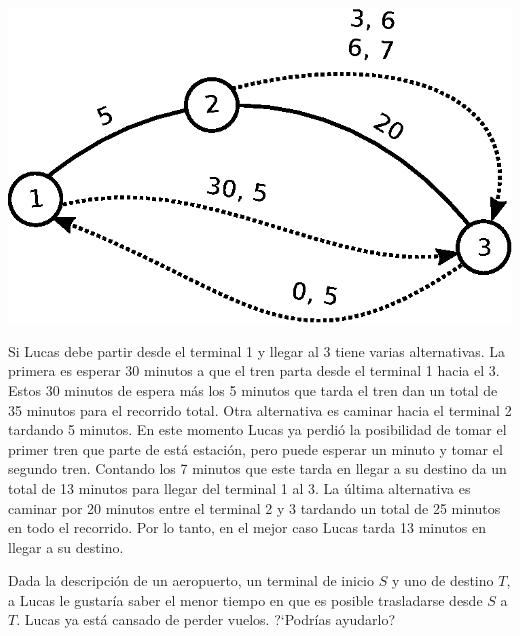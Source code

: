 \documentclass{oci}
\begin{document}
\begin{problemDescription}
  \begin{center}
  \includegraphics[scale=0.7]{aeropuerto}
  \end{center}

  Si Lucas debe partir desde el terminal 1 y llegar al 3 tiene varias
  alternativas.
  La primera es esperar 30 minutos a que el tren parta desde el terminal 1 hacia
  el 3.
  Estos 30 minutos de espera más los 5 minutos que tarda el tren dan un total de
  35 minutos para el recorrido total.
  Otra alternativa es caminar hacia el terminal 2 tardando 5 minutos.
  En este momento Lucas ya perdió la posibilidad de tomar el primer tren que
  parte de está estación, pero puede esperar un minuto y tomar el segundo tren.
  Contando los 7 minutos que este tarda en llegar a su destino da un total de 13
  minutos para llegar del terminal 1 al 3.
  La última alternativa es caminar por 20 minutos entre el terminal 2 y 3
  tardando un total de 25 minutos en todo el recorrido.
  Por lo tanto, en el mejor caso Lucas tarda 13 minutos en llegar a su destino.

  Dada la descripción de un aeropuerto, un terminal de inicio $S$ y uno de
  destino $T$, a Lucas le gustaría saber el menor tiempo en que es posible
  trasladarse desde $S$ a $T$.
  Lucas ya está cansado de perder vuelos.
  ?`Podrías ayudarlo?
\end{problemDescription}
\end{document}
